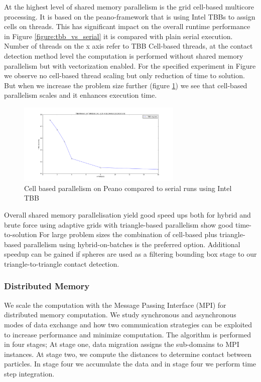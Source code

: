 \documentclass[times,12pt]{article}
\begin{document}
At the highest level of shared memory parallelism is the grid cell-based multicore processing. It is based on the peano-framework that is using Intel TBBs to assign cells on threads. This has significant impact on the overall runtime performance in Figure \ref{figure:tbb_vs_serial} it is compared with plain serial execution. Number of threads on the x axis refer to TBB Cell-based threads, at the contact detection method level the computation is performed without shared memory parallelism but with vectorization enabled. For the specified experiment in Figure {} we observe no cell-based thread scaling but only reduction of time to solution. But when we increase the problem size further (figure \ref{figure:tbb_scaling}) we see that cell-based parallelism scales and it enhances execution time. 

\begin{figure}[htb]
  \begin{center}
    \includegraphics[width=0.7\textwidth]{experiments/random/omp/tbb_regular_x2.png}
  \end{center}
  \caption{Cell based parallelism on Peano compared to serial runs using Intel TBB}
  \label{figure:tbb_scaling}
\end{figure}

Overall shared memory parallelisation yield good speed ups both for hybrid and brute force using adaptive grids with triangle-based parallelism show good time-to-solution For large problem sizes the combination of cell-based plus triangle-based parallelism using hybrid-on-batches is the preferred option. Additional speedup can be gained if spheres are used as a filtering bounding box stage to our triangle-to-triangle contact detection.

\clearpage 

\subsubsection{Distributed Memory}

We scale the computation with the Message Passing Interface (MPI) \cite{Forum:1994:MMI:898758} for distributed memory computation. We study synchronous and asynchronous modes of data exchange and how two communication strategies can be exploited to increase performance and minimize computation. The algorithm is performed in four stages; At stage one, data migration assigns the sub-domains to MPI instances. At stage two, we compute the distances to determine contact between particles. In stage four we accumulate the data and in stage four we perform time step integration.
\end{document}
